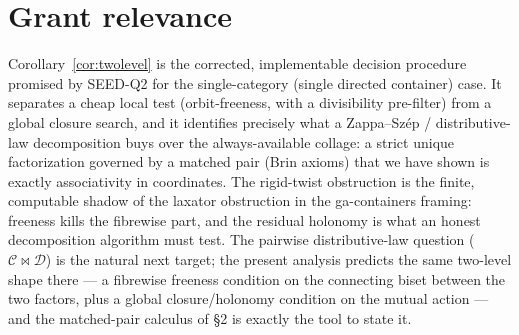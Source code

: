 \documentclass[11pt]{article}
\theoremstyle{definition}
\newcommand{\C}{\mathcal{C}}
\newcommand{\D}{\mathcal{D}}
\begin{document}
\section{Grant relevance}

Corollary~\ref{cor:twolevel} is the corrected, implementable decision procedure
promised by SEED-Q2 for the single-category (single directed container) case. It
separates a cheap local test (orbit-freeness, with a divisibility pre-filter) from
a global closure search, and it identifies precisely what a Zappa--Sz\'ep /
distributive-law decomposition buys over the always-available collage: a strict
unique factorization governed by a matched pair (Brin axioms) that we have shown
is exactly associativity in coordinates. The rigid-twist obstruction is the
finite, computable shadow of the laxator obstruction in the ga-containers framing:
freeness kills the fibrewise part, and the residual holonomy is what an honest
decomposition algorithm must test. The pairwise distributive-law question
($\C\bowtie\D$) is the natural next target; the present analysis predicts the same
two-level shape there --- a fibrewise freeness condition on the connecting biset
between the two factors, plus a global closure/holonomy condition on the mutual
action --- and the matched-pair calculus of \S2 is exactly the tool to state it.
\end{document}
